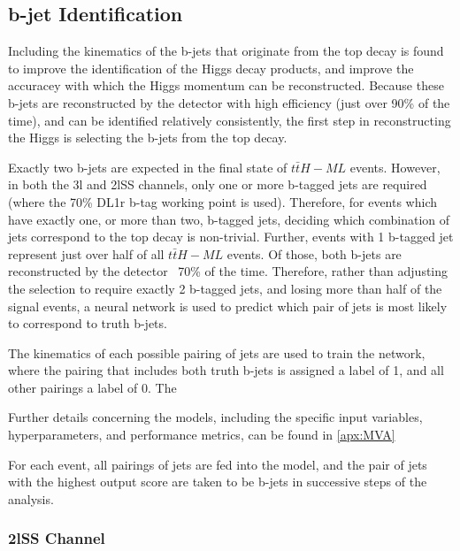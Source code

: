 \subsection{b-jet Identification}
\label{sec:bjetID}

Including the kinematics of the b-jets that originate from the top decay is found to improve the identification of the Higgs decay products, and improve the accuracey with which the Higgs momentum can be reconstructed. Because these b-jets are reconstructed by the detector with high efficiency (just over 90\% of the time), and can be identified relatively consistently, the first step in reconstructing the Higgs is selecting the b-jets from the top decay.

Exactly two b-jets are expected in the final state of $t\bar{t}H-ML$ events. However, in both the 3l and 2lSS channels, only one or more b-tagged jets are required (where the 70\% DL1r b-tag working point is used). Therefore, for events which have exactly one, or more than two, b-tagged jets, deciding which combination of jets correspond to the top decay is non-trivial. Further, events with 1 b-tagged jet represent just over half of all $t\bar{t}H-ML$ events. Of those, both b-jets are reconstructed by the detector ~70\% of the time. Therefore, rather than adjusting the selection to require exactly 2 b-tagged jets, and losing more than half of the signal events, a neural network is used to predict which pair of jets is most likely to correspond to truth b-jets.

The kinematics of each possible pairing of jets are used to train the network, where the pairing that includes both truth b-jets is assigned a label of 1, and all other pairings a label of 0. The 



Further details concerning the models, including the specific input variables, hyperparameters, and performance metrics, can be found in \ref{apx:MVA}

For each event, all pairings of jets are fed into the model, and the pair of jets with the highest output score are taken to be b-jets in successive steps of the analysis. 

\subsubsection{2lSS Channel}
\label{subsec:top2lSS}

